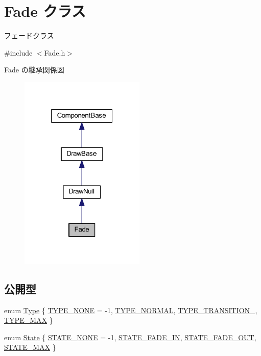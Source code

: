 \hypertarget{class_fade}{}\section{Fade クラス}
\label{class_fade}


フェードクラス  




{\ttfamily \#include $<$Fade.\+h$>$}



Fade の継承関係図\nopagebreak
\begin{figure}[H]
\begin{center}
\leavevmode
\includegraphics[width=169pt]{class_fade__inherit__graph}
\end{center}
\end{figure}
\subsection*{公開型}
\begin{DoxyCompactItemize}
\item 
enum \mbox{\hyperlink{class_fade_ac06f27215b454aa05b93c236476d6e80}{Type}} \{ \mbox{\hyperlink{class_fade_ac06f27215b454aa05b93c236476d6e80aff416f0a20b074a38a4f67e20f001828}{T\+Y\+P\+E\+\_\+\+N\+O\+NE}} = -\/1, 
\mbox{\hyperlink{class_fade_ac06f27215b454aa05b93c236476d6e80a6058f5db637853756ba18166da96043e}{T\+Y\+P\+E\+\_\+\+N\+O\+R\+M\+AL}}, 
\mbox{\hyperlink{class_fade_ac06f27215b454aa05b93c236476d6e80af424897abd4b53f7af0bf51f1190a427}{T\+Y\+P\+E\+\_\+\+T\+R\+A\+N\+S\+I\+T\+I\+O\+N\+\_}}, 
\mbox{\hyperlink{class_fade_ac06f27215b454aa05b93c236476d6e80ab05e3987a6b16a8ebe7e284aa8922ea0}{T\+Y\+P\+E\+\_\+\+M\+AX}}
 \}
\item 
enum \mbox{\hyperlink{class_fade_ae77826bf3ff2ab95fb7b3b6f95cba80a}{State}} \{ \mbox{\hyperlink{class_fade_ae77826bf3ff2ab95fb7b3b6f95cba80aae593109007af793c6b0e7e287dcc7803}{S\+T\+A\+T\+E\+\_\+\+N\+O\+NE}} = -\/1, 
\mbox{\hyperlink{class_fade_ae77826bf3ff2ab95fb7b3b6f95cba80aa5b9862985db043392d465dd7a7a7805b}{S\+T\+A\+T\+E\+\_\+\+F\+A\+D\+E\+\_\+\+IN}}, 
\mbox{\hyperlink{class_fade_ae77826bf3ff2ab95fb7b3b6f95cba80aa41e3fdc3eb47279527440d923fccbb6e}{S\+T\+A\+T\+E\+\_\+\+F\+A\+D\+E\+\_\+\+O\+UT}}, 
\mbox{\hyperlink{class_fade_ae77826bf3ff2ab95fb7b3b6f95cba80aab65dcff35c00997ef90c43d254906121}{S\+T\+A\+T\+E\+\_\+\+M\+AX}}
 \}
\end{DoxyCompactItemize}
